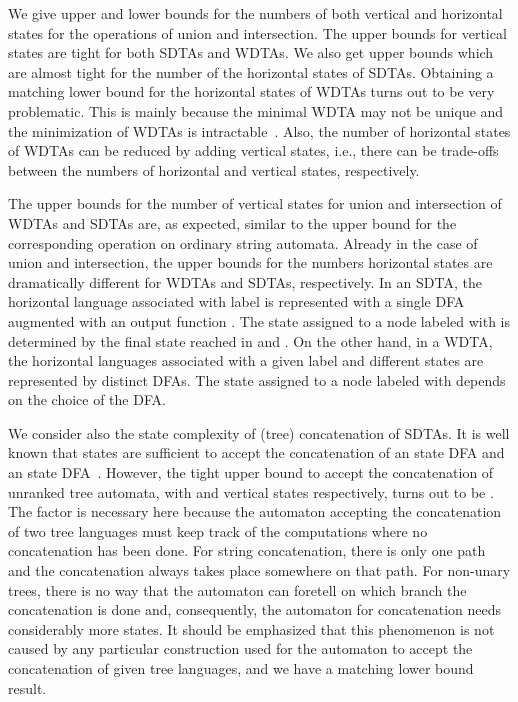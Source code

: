 \documentclass[copyright]{eptcs}
\begin{document}
We give upper  and lower bounds for
the numbers of both vertical and
horizontal states for the operations of union and intersection.
The upper bounds for vertical states
are tight for both SDTAs and WDTAs. We also get upper bounds which
are almost tight for the number
of the horizontal states of SDTAs. Obtaining
a matching
lower bound for the horizontal states of WDTAs turns out to be
very problematic. This is mainly because the minimal WDTA may not
be unique and the minimization of WDTAs is intractable~\cite{mn}.
Also, the number of horizontal states of WDTAs can be reduced by
adding vertical states, i.e., there can be trade-offs between
the numbers of horizontal and vertical states, respectively.

The upper bounds for the number of
 vertical states for union
and intersection of WDTAs and SDTAs are,
as expected, similar to the upper
bound for the corresponding operation on ordinary string automata.
Already in the case of union and intersection,
the upper bounds for the numbers
horizontal states  are dramatically different for WDTAs and
SDTAs, respectively.
In an SDTA, the
horizontal language associated with label  is represented
with a single DFA  augmented with an output function
. The state assigned to a node labeled with  is
determined by the final state reached in  and .
On the other hand, in a WDTA, the horizontal languages associated
with a given label  and different states are represented
by distinct DFAs. The state assigned to a node labeled with 
depends on the choice of the DFA.

We consider also the state complexity of
 (tree)
concatenation of  SDTAs. It is well known
that  states are sufficient to accept the
concatenation of an  state DFA and an  state
DFA~\cite{YuZhSa94}. However, the tight upper bound to accept the
concatenation of
unranked tree automata,
with  and  vertical states respectively,
turns out to be . The
factor  is necessary here because the automaton accepting
the concatenation of two tree languages must keep track of the
computations where no concatenation has been done. For string
concatenation, there is only one path and the concatenation always
takes place  somewhere on that path.
For non-unary trees, there is no way
that the automaton can foretell on which branch the concatenation
is done and, consequently, the automaton for concatenation needs
considerably more states.
 It should be emphasized
that this phenomenon is not caused by any particular construction
used for the automaton to accept the concatenation of given tree
languages, and we have a matching lower bound result.
\end{document}
